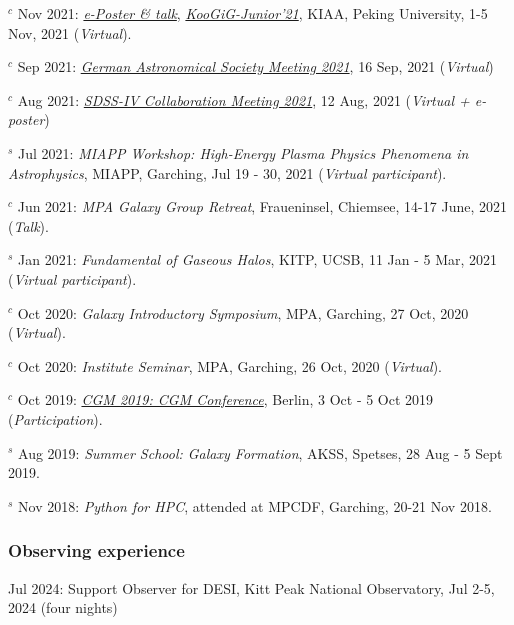 \documentclass[12pt,letterpaper]{article}
\begin{document}
\begin{list}{}{\cvlist}
\item $^c$ Nov 2021:  \emph{\href{https://www.bilibili.com/video/BV1nv411M7w3}{e-Poster \& talk}}, \emph{\href{https://kiaa.pku.edu.cn/KooGig_junior21/Home.htm}{KooGiG-Junior'21}}, KIAA, Peking University, 1-5 Nov, 2021 (\textit{Virtual}).   

\item $^c$ Sep 2021:  \emph{\href{https://ag2021.astronomische-gesellschaft.de/view_splinter.php?session=Stars}{German Astronomical Society Meeting 2021}}, 16 Sep, 2021 (\textit{Virtual})   
\item $^c$ Aug 2021:  \emph{\href{https://jhu2021.sdss.org/}{SDSS-IV Collaboration Meeting 2021}}, 12 Aug, 2021 (\textit{Virtual + e-poster})   
\item $^s$ Jul 2021:  \emph{MIAPP Workshop: High-Energy Plasma Physics Phenomena in Astrophysics}, MIAPP, Garching, Jul 19 - 30, 2021 (\textit{Virtual participant}).  

\item $^c$ Jun 2021:  \emph{MPA Galaxy Group Retreat}, Fraueninsel, Chiemsee, 14-17 June, 2021 (\textit{Talk}).  
\item $^s$ Jan 2021:  \emph{Fundamental of Gaseous Halos}, KITP, UCSB, 11 Jan - 5 Mar, 2021 (\textit{Virtual participant}).  
\item $^c$ Oct 2020:  \emph{Galaxy Introductory Symposium}, MPA, Garching, 27 Oct, 2020 (\textit{Virtual}).  
\item $^c$ Oct 2020:  \emph{Institute Seminar}, MPA, Garching, 26 Oct, 2020 (\textit{Virtual}).  

\item $^c$ Oct 2019:  \emph{\href{https://wwwmpa.mpa-garching.mpg.de/conf/berlincgm2019/}{CGM 2019: CGM Conference}}, Berlin, 3 Oct - 5 Oct 2019 (\textit{Participation}).  
\item $^s$ Aug 2019:  \emph{Summer School: Galaxy Formation}, AKSS, Spetses, 28 Aug - 5 Sept 2019.  
\item $^s$ Nov 2018:  \emph{Python for HPC}, attended at MPCDF, Garching, 20-21 Nov 2018.  
\end{list}

 \subsubsection{Observing experience}
  \begin{list}{}{\cvlist}
  \item Jul 2024: Support Observer for DESI, Kitt Peak National Observatory,    Jul 2-5, 2024 (four nights)
  \end{list}
\end{document}
